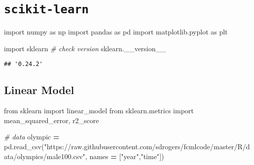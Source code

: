 \documentclass[
]{book}
\newenvironment{Shaded}{\begin{snugshade}}{\end{snugshade}}
\newcommand{\CommentTok}[1]{\textcolor[rgb]{0.56,0.35,0.01}{\textit{#1}}}
\newcommand{\ImportTok}[1]{#1}
\newcommand{\NormalTok}[1]{#1}
\newcommand{\OperatorTok}[1]{\textcolor[rgb]{0.81,0.36,0.00}{\textbf{#1}}}
\newcommand{\StringTok}[1]{\textcolor[rgb]{0.31,0.60,0.02}{#1}}
\begin{document}
\hypertarget{scikit-learn}{%
\chapter{\texorpdfstring{\texttt{scikit-learn}}{scikit-learn}}\label{scikit-learn}}

\begin{Shaded}
\begin{Highlighting}[]
\ImportTok{import}\NormalTok{ numpy }\ImportTok{as}\NormalTok{ np}
\ImportTok{import}\NormalTok{ pandas }\ImportTok{as}\NormalTok{ pd}
\ImportTok{import}\NormalTok{ matplotlib.pyplot }\ImportTok{as}\NormalTok{ plt}
\end{Highlighting}
\end{Shaded}

\begin{Shaded}
\begin{Highlighting}[]
\ImportTok{import}\NormalTok{ sklearn}
\CommentTok{\# check version}
\NormalTok{sklearn.\_\_version\_\_ }
\end{Highlighting}
\end{Shaded}

\begin{verbatim}
## '0.24.2'
\end{verbatim}

\hypertarget{linear-model}{%
\section{Linear Model}\label{linear-model}}

\begin{Shaded}
\begin{Highlighting}[]
\ImportTok{from}\NormalTok{ sklearn }\ImportTok{import}\NormalTok{ linear\_model}
\ImportTok{from}\NormalTok{ sklearn.metrics }\ImportTok{import}\NormalTok{ mean\_squared\_error, r2\_score}
\end{Highlighting}
\end{Shaded}

\begin{Shaded}
\begin{Highlighting}[]
\CommentTok{\# data}
\NormalTok{olympic }\OperatorTok{=}\NormalTok{ pd.read\_csv(}\StringTok{"https://raw.githubusercontent.com/sdrogers/fcmlcode/master/R/data/olympics/male100.csv"}\NormalTok{, names }\OperatorTok{=}\NormalTok{ [}\StringTok{"year"}\NormalTok{,}\StringTok{"time"}\NormalTok{])}
\end{Highlighting}
\end{Shaded}
\end{document}
